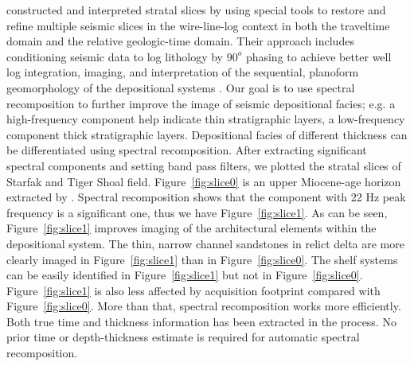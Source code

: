 \cite{Zeng3} constructed and interpreted stratal slices by using special tools to restore and refine multiple seismic slices in the wire-line-log context in both the traveltime domain and the relative geologic-time domain. Their approach includes conditioning seismic data to log lithology by $90^o$ phasing to achieve better well log integration, imaging, and interpretation of the sequential, planoform geomorphology of the depositional systems \cite[]{GEO70-03-C7C15}. Our goal is to use spectral recomposition to further improve the image of seismic depositional facies; e.g. a high-frequency component  help indicate thin stratigraphic layers,  a low-frequency component   thick stratigraphic layers.  Depositional facies of different thickness can be differentiated using spectral recomposition. After extracting significant spectral components and setting band pass filters, we plotted the stratal slices of Starfak and Tiger Shoal field. Figure~\ref{fig:slice0} is an upper Miocene-age horizon extracted by \cite{Zeng1}. Spectral recomposition shows that the component with 22 Hz peak frequency is a significant one, thus we have Figure~\ref{fig:slice1}. As can be seen, Figure~\ref{fig:slice1} improves imaging of the architectural elements within the depositional system. The thin, narrow channel sandstones in relict delta are more clearly imaged in Figure~\ref{fig:slice1} than in Figure~\ref{fig:slice0}. The shelf systems can be easily identified in Figure~\ref{fig:slice1} but not in Figure~\ref{fig:slice0}. Figure~\ref{fig:slice1} is also less affected by acquisition footprint compared with Figure~\ref{fig:slice0}. More than that, spectral recomposition works more efficiently. Both true time and thickness information has been extracted in the process. No prior time or depth-thickness estimate is required for automatic spectral recomposition.


